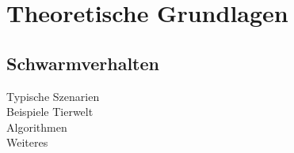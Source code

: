 \section{Theoretische Grundlagen}
\subsection{Schwarmverhalten}
Typische Szenarien\\
Beispiele Tierwelt\\
Algorithmen\\
Weiteres
